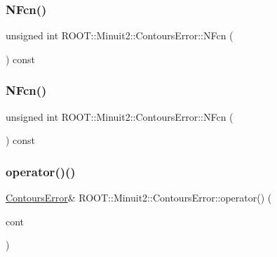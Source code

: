 \subsubsection{\texorpdfstring{NFcn()}{NFcn()}\hspace{0.1cm}{\footnotesize\ttfamily [2/3]}}
{\footnotesize\ttfamily unsigned int R\+O\+O\+T\+::\+Minuit2\+::\+Contours\+Error\+::\+N\+Fcn (\begin{DoxyParamCaption}{ }\end{DoxyParamCaption}) const\hspace{0.3cm}{\ttfamily [inline]}}

\mbox{\label{classROOT_1_1Minuit2_1_1ContoursError_a1342abcb15690e6897ad860e7f05026d}} 
\subsubsection{\texorpdfstring{NFcn()}{NFcn()}\hspace{0.1cm}{\footnotesize\ttfamily [3/3]}}
{\footnotesize\ttfamily unsigned int R\+O\+O\+T\+::\+Minuit2\+::\+Contours\+Error\+::\+N\+Fcn (\begin{DoxyParamCaption}{ }\end{DoxyParamCaption}) const\hspace{0.3cm}{\ttfamily [inline]}}

\mbox{\label{classROOT_1_1Minuit2_1_1ContoursError_a17f1d0a4579d605cd25da8e0e27bf4ba}} 
\subsubsection{\texorpdfstring{operator()()}{operator()()}\hspace{0.1cm}{\footnotesize\ttfamily [1/6]}}
{\footnotesize\ttfamily \mbox{\hyperlink{classROOT_1_1Minuit2_1_1ContoursError}{Contours\+Error}}\& R\+O\+O\+T\+::\+Minuit2\+::\+Contours\+Error\+::operator() (\begin{DoxyParamCaption}\item[{const \mbox{\hyperlink{classROOT_1_1Minuit2_1_1ContoursError}{Contours\+Error}} \&}]{cont }\end{DoxyParamCaption})\hspace{0.3cm}{\ttfamily [inline]}}

